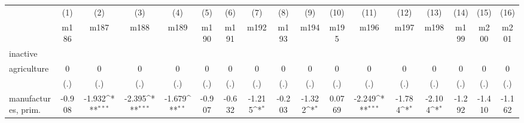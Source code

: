 {
\def\sym#1{\ifmmode^{#1}\else\(^{#1}\)\fi}
\begin{tabular}{l*{16}{c}}
\hline\hline
                    &\multicolumn{1}{c}{(1)}&\multicolumn{1}{c}{(2)}&\multicolumn{1}{c}{(3)}&\multicolumn{1}{c}{(4)}&\multicolumn{1}{c}{(5)}&\multicolumn{1}{c}{(6)}&\multicolumn{1}{c}{(7)}&\multicolumn{1}{c}{(8)}&\multicolumn{1}{c}{(9)}&\multicolumn{1}{c}{(10)}&\multicolumn{1}{c}{(11)}&\multicolumn{1}{c}{(12)}&\multicolumn{1}{c}{(13)}&\multicolumn{1}{c}{(14)}&\multicolumn{1}{c}{(15)}&\multicolumn{1}{c}{(16)}\\
                    &\multicolumn{1}{c}{m186}&\multicolumn{1}{c}{m187}&\multicolumn{1}{c}{m188}&\multicolumn{1}{c}{m189}&\multicolumn{1}{c}{m190}&\multicolumn{1}{c}{m191}&\multicolumn{1}{c}{m192}&\multicolumn{1}{c}{m193}&\multicolumn{1}{c}{m194}&\multicolumn{1}{c}{m195}&\multicolumn{1}{c}{m196}&\multicolumn{1}{c}{m197}&\multicolumn{1}{c}{m198}&\multicolumn{1}{c}{m199}&\multicolumn{1}{c}{m200}&\multicolumn{1}{c}{m201}\\
\hline
inactive            &                     &                     &                     &                     &                     &                     &                     &                     &                     &                     &                     &                     &                     &                     &                     &                     \\
agriculture         &           0         &           0         &           0         &           0         &           0         &           0         &           0         &           0         &           0         &           0         &           0         &           0         &           0         &           0         &           0         &           0         \\
                    &         (.)         &         (.)         &         (.)         &         (.)         &         (.)         &         (.)         &         (.)         &         (.)         &         (.)         &         (.)         &         (.)         &         (.)         &         (.)         &         (.)         &         (.)         &         (.)         \\
[1em]
manufactures, prim. &      -0.908         &      -1.932\sym{***}&      -2.395\sym{***}&      -1.679\sym{**} &      -0.907         &      -0.632         &      -1.215\sym{*}  &      -0.203         &      -1.322\sym{*}  &      0.0769         &      -2.249\sym{***}&      -1.784\sym{*}  &      -2.104\sym{*}  &      -1.292         &      -1.410         &      -1.162         \\

\end{tabular}}
